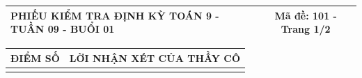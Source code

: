 \documentclass[12pt,a4paper]{article}
\begin{document}
\pagestyle{empty}
\noindent
\begin{tabularx}{\linewidth}{|X|c|}
\hline
\textbf{PHIẾU KIỂM TRA ĐỊNH KỲ TOÁN 9 - TUẦN 09 - BUỔI 01} & \textbf{Mã đề: 101 - Trang 1/2} \\
\hline
\end{tabularx}

\vspace{1.0mm}

\noindent
\begin{tabularx}{\linewidth}{|p{3.2cm}|X|}
\hline
\centering\textbf{ĐIỂM SỐ} & \centering\textbf{LỜI NHẬN XÉT CỦA THẦY CÔ} \tabularnewline
\hline
\rule{0pt}{1.8cm} & \tabularnewline
\hline
\end{tabularx}
\end{document}
